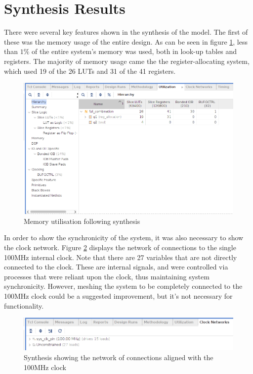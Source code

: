 \documentclass[12pt,a4paper]{article}
\begin{document}
\section{Synthesis Results}

There were several key features shown in the synthesis of the model. The first of these was the memory usage of the entire design. As can be seen in figure \ref{fig:memory}, less than $1\%$ of the entire system's memory was used, both in look-up tables and registers. The majority of memory usage came the the register-allocating system, which used 19 of the 26 LUTs and 31 of the 41 registers.

\begin{figure}[H]
    \centering
    \includegraphics[scale=0.25]{images/memory_utilisation.png}
    \caption{Memory utilisation following synthesis}
    \label{fig:memory}
\end{figure}

In order to show the synchronicity of the system, it was also necessary to show the clock network. Figure \ref{fig:clk_network} displays the network of connections to the single 100MHz internal clock. Note that there are 27 variables that are not directly connected to the clock. These are internal signals, and were controlled via processes that were reliant upon the clock, thus maintaining system synchronicity. However, meshing the system to be completely connected to the 100MHz clock could be a suggested improvement, but it's not necessary for functionality.

\begin{figure}[H]
    \centering
    \includegraphics[scale=0.25]{images/clk_network.png}
    \caption{Synthesis showing the network of connections aligned with the 100MHz clock}
    \label{fig:clk_network}
\end{figure}
\end{document}
